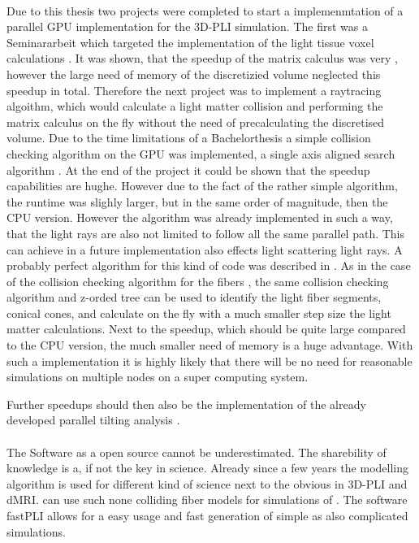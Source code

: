 \paragraph{}
\dummy{}
\par
Due to this thesis two projects were completed to start a implemenmtation of a parallel \ac{GPU} implementation for the \ac{3D-PLI} simulation.
The first was a Seminararbeit \cite{Kobusch:Seminar} which targeted the implementation of the light tissue voxel calculations \dummy{}.
It was shown, that the speedup of the matrix calculus was very \dummy{}, however the large need of memory of the discretizied volume neglected this speedup in total.
Therefore the next project \cite{Kobusch:887783} was to implement a raytracing algoithm, which would calculate a light matter collision and performing the matrix calculus on the fly without the need of precalculating the discretised volume.
Due to the time limitations of a Bachelorthesis a simple collision checking algorithm on the \ac{GPU} was implemented, a single axis aligned search algorithm \cite{Karras2012}.
At the end of the project it could be shown that the speedup capabilities are hughe.
However due to the fact of the rather simple algorithm, the runtime was slighly larger, but in the same order of magnitude, then the \ac{CPU} version.
However the algorithm was already implemented in such a way, that the light rays are also not limited to follow all the same parallel path.
This can achieve in a future implementation also effects light scattering light rays.
A probably perfect algorithm for this kind of code was described in \cite{Karras2012}.
As in the case of the collision checking algorithm for the fibers \dummy{}, the same collision checking algorithm and z-orded tree can be used to identify the light fiber segments, \ie{} conical cones, and calculate on the fly with a much smaller step size the light matter calculations.
Next to the speedup, which should be quite large compared to the \ac{CPU} version, the much smaller need of memory is a huge advantage.
With such a implementation it is highly likely that there will be no need for reasonable simulations on multiple nodes on a super computing system.
\par
% 
Further speedups should then also be the implementation of the already developed parallel tilting analysis \dummy{}.
%
% 
% 
\paragraph{}
% 
The Software as a open source cannot be underestimated.
The sharebility of knowledge is a, if not the key in science.
Already since a few years the modelling algorithm is used for different kind of science next to the obvious in \ac{3D-PLI} and \ac{dMRI}.
\cite{Ji2021} can use such none colliding fiber models for simulations of \dummy{}.
The software \ac{fastPLI} allows for a easy usage and fast generation of simple as also complicated simulations.
% 
% 
% 
